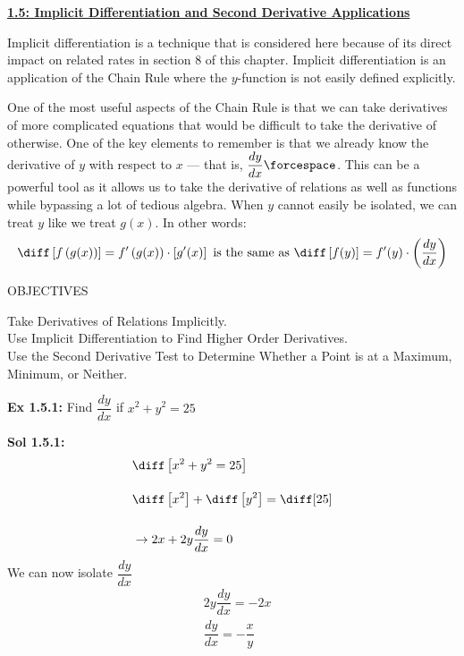 \textbf{\underline{\large{1.5: Implicit Differentiation and Second Derivative Applications}}} \par

Implicit differentiation is a technique that is considered here because of its direct impact on related rates in section 8 of this chapter. Implicit differentiation is an application of the Chain Rule where the $y$-function is not easily defined explicitly. \par 

One of the most useful aspects of the Chain Rule is that we can take derivatives of more complicated equations that would be difficult to take the derivative of otherwise. One of the key elements to remember is that we already know the derivative of $y$ with respect to $x$ --- that is, $\dfrac{dy}{dx} \forcespace$. This can be a powerful tool as it allows us to take the derivative of relations as well as functions while bypassing a lot of tedious algebra. When $y$ cannot easily be isolated, we can treat $y$ like we treat $g(x)$. In other words: \begin{align*}
    \diff \left[f\left(g(x)\right)\right] = f'\left(g(x)\right) \cdot \left[g'(x)\right] \text{ is the same as } \diff \left[f(y)\right] = f'(y) \cdot \left(\dfrac{dy}{dx}\right)
\end{align*}

\begin{tcolorbox}[objective]
    \begin{center}
        OBJECTIVES \\[11pt]
    \end{center}
    Take Derivatives of Relations Implicitly. \\
    Use Implicit Differentiation to Find Higher Order Derivatives. \\
    Use the Second Derivative Test to Determine Whether a Point is at a Maximum, Minimum, or Neither.
\end{tcolorbox} \vspace{11pt}

\begin{tcolorbox}[example]
    \textbf{Ex 1.5.1: } Find $\dfrac{dy}{dx}$ if $x^2 + y^2 = 25$
\end{tcolorbox}
\begin{tcolorbox}[solution]
    \textbf{Sol 1.5.1: } \begin{align*}
        & \diff \left[x^2 + y^2 = 25\right] \\[11pt]
        & \diff \left[x^2\right] + \diff \left[y^2\right] = \diff [25] \\[11pt]
        & \rightarrow 2x + 2y\dfrac{dy}{dx} = 0 
    \end{align*}
    We can now isolate $\dfrac{dy}{dx}$ \begin{align*}
        & 2y\dfrac{dy}{dx} = -2x \\[11pt]
        & \dfrac{dy}{dx} = \boxed{-\dfrac{x}{y}}
    \end{align*}
\end{tcolorbox}


